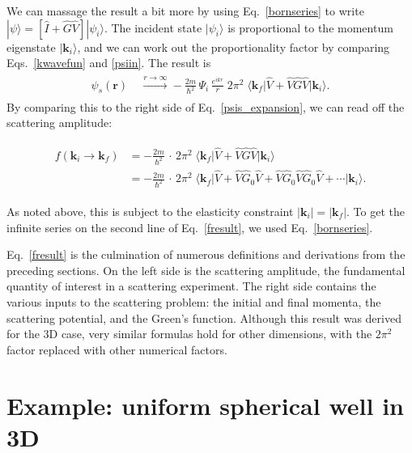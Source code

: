 \documentclass[pra,12pt]{revtex4-2}
\begin{document}
We can massage the result a bit more by using Eq.~\eqref{bornseries}
to write $|\psi\rangle = [\hat{I} + \hat{G}\hat{V}]|\psi_i\rangle$.
The incident state $|\psi_i\rangle$ is proportional to the momentum
eigenstate $|\mathbf{k}_i\rangle$, and we can work out the
proportionality factor by comparing Eqs.~\eqref{kwavefun} and
\eqref{psiin}.  The result is
\begin{align}
  \begin{aligned}\psi_s(\mathbf{r}) \; &\overset{r\rightarrow\infty}{\longrightarrow} - \frac{2m}{\hbar^2} \, \Psi_i\, \frac{e^{ikr}}{r} \; 2\pi^2 \; \big\langle \mathbf{k}_f \big|\hat{V} + \hat{V}\hat{G}\hat{V}\big|\mathbf{k}_i\big\rangle.\end{aligned}
\end{align}
By comparing this to the right side of Eq.~\eqref{psis_expansion}, we
can read off the scattering amplitude:
\begin{framed}
  \begin{align}
    \begin{aligned}
      f(\mathbf{k}_i \rightarrow \mathbf{k}_f) &= - \frac{2m}{\hbar^2} \,\cdot \, 2\pi^2 \; \big\langle \mathbf{k}_f\big| \hat{V} + \hat{V}\hat{G} \hat{V} \big|\mathbf{k}_i\big\rangle \\
      &= - \frac{2m}{\hbar^2} \,\cdot \, 2\pi^2 \; \big\langle \mathbf{k}_f\big| \hat{V} + \hat{V}\hat{G}_0 \hat{V} + \hat{V} \hat{G}_0 \hat{V} \hat{G}_0\hat{V} + \cdots \big|\mathbf{k}_i\big\rangle.  \end{aligned}
    \label{fresult}
  \end{align}
\end{framed}
\vskip -0.15in
\noindent
As noted above, this is subject to the elasticity constraint
$|\mathbf{k}_i| = |\mathbf{k}_f|$.  To get the infinite series on the
second line of Eq.~\eqref{fresult}, we used Eq.~\eqref{bornseries}.

Eq.~\eqref{fresult} is the culmination of numerous definitions and
derivations from the preceding sections.  On the left side is the
scattering amplitude, the fundamental quantity of interest in a
scattering experiment.  The right side contains the various inputs to
the scattering problem: the initial and final momenta, the scattering
potential, and the Green's function.  Although this result was derived
for the 3D case, very similar formulas hold for other dimensions, with
the $2\pi^2$ factor replaced with other numerical factors.

\section{Example: uniform spherical well in 3D}
\end{document}
